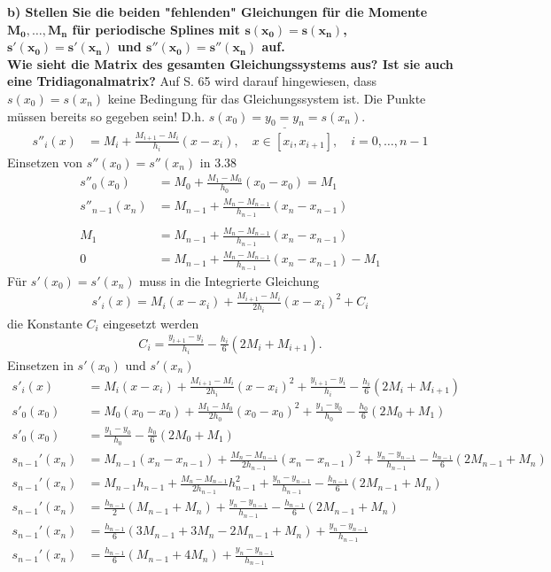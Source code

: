 \documentclass[10pt,a4paper]{article}
\begin{document}
	\newpage
	\textbf{%
		b) Stellen Sie die beiden "fehlenden" Gleichungen für die Momente $\pmb{M_0, \dots, M_n}$ für periodische Splines mit $\pmb{s(x_0) = s(x_n)}$, $\pmb{s′(x_0) = s′(x_n)}$ und $\pmb{s''(x_0)=s''(x_n)}$ auf. \\
		Wie sieht die Matrix des gesamten Gleichungssystems aus? Ist sie auch eine Tridiagonalmatrix?
	}
		Auf S. 65 wird darauf hingewiesen, dass $s(x_0)=s(x_n)$ keine Bedingung für das Gleichungssystem ist. Die Punkte müssen bereits so gegeben sein! D.h. $s(x_0)=\underline{y_0=y_n}=s(x_n)$.
		\begin{align}\tag{3.38}
			s''_i(x)&=M_i+\frac{M_{i+1}-M_i}{h_i}(x-x_i), \quad x \in [x_i, x_{i+1}], \quad i=0,\dots,n-1
        \end{align}
        Einsetzen von $s''(x_0)=s''(x_n)$ in 3.38
        \begin{align*}
			s''_0(x_0)&=M_0+\frac{M_{1}-M_0}{h_0}(x_0-x_0) = M_1 \\ s''_{n-1}(x_n)&=M_{n-1}+\frac{M_{n}-M_{n-1}}{h_{n-1}}(x_n-x_{n-1}) \\
            \\
            M_1 &= M_{n-1}+\frac{M_{n}-M_{n-1}}{h_{n-1}}(x_n-x_{n-1}) \\
            0 &= M_{n-1}+\frac{M_{n}-M_{n-1}}{h_{n-1}}(x_n-x_{n-1})-M_1
		\end{align*}
        Für $s′(x_0) = s′(x_n)$ muss in die Integrierte Gleichung
        \begin{align}\tag{3.82}
            s'_i(x)=M_i(x-x_i)+\frac{M_{i+1}-M_i}{2h_i}(x-x_i)^2+C_i
        \end{align}
        die Konstante $C_i$ eingesetzt werden
        \begin{align}\tag{3.84}
            C_i=\frac{y_{i+1}-y_i}{h_i}-\frac{h_i}{6}(2M_i+M_{i+1}).
        \end{align}
        Einsetzen in $s′(x_0) \text{ und } s′(x_n)$
        \begin{align*}
            s'_i(x)&=M_i(x-x_i)+\frac{M_{i+1}-M_i}{2h_i}(x-x_i)^2+\frac{y_{i+1}-y_i}{h_i}-\frac{h_i}{6}(2M_i+M_{i+1}) \\
            s'_0(x_0)&=M_0(x_0-x_0)+\frac{M_1-M_0}{2h_0}(x_0-x_0)^2+\frac{y_1-y_0}{h_0}-\frac{h_0}{6}(2M_0+M_1) \\
            s'_0(x_0)&=\frac{y_1-y_0}{h_0}-\frac{h_0}{6}(2M_0+M_1) \\
            s_{n-1}′(x_n)&=M_{n-1}(x_n-x_{n-1})+\frac{M_n-M_{n-1}}{2h_{n-1}}(x_n-x_{n-1})^2+\frac{y_n-y_{n-1}}{h_{n-1}}-\frac{h_{n-1}}{6}(2M_{n-1}+M_n) \\
            s_{n-1}′(x_n)&=M_{n-1}h_{n-1}+\frac{M_n-M_{n-1}}{2h_{n-1}}h_{n-1}^2+\frac{y_n-y_{n-1}}{h_{n-1}}-\frac{h_{n-1}}{6}(2M_{n-1}+M_n) \\
            s_{n-1}′(x_n)&=\frac{h_{n-1}}{2}(M_{n-1}+M_n)+\frac{y_n-y_{n-1}}{h_{n-1}}-\frac{h_{n-1}}{6}(2M_{n-1}+M_n) \\
            s_{n-1}′(x_n)&=\frac{h_{n-1}}{6}\left(3M_{n-1}+3M_n-2M_{n-1}+M_n\right)+\frac{y_n-y_{n-1}}{h_{n-1}}  \\
            s_{n-1}′(x_n)&=\frac{h_{n-1}}{6}\left(M_{n-1}+4M_n\right)+\frac{y_n-y_{n-1}}{h_{n-1}} 
        \end{align*}
\end{document}
